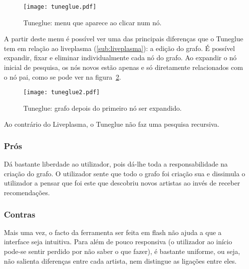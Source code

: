 \begin{figure}[tb]
  \begin{center}
    \texttt{[image: tuneglue.pdf]}
  \end{center}
  \caption{Tuneglue: menu que aparece ao clicar num nó.}
  \label{fig:sota_tuneglue}
\end{figure}

A partir deste menu é possível ver uma das principais diferenças que o Tuneglue tem em relação ao liveplasma (\ref{sub:liveplasma}): a edição do grafo.
É possível expandir, fixar e eliminar individualmente cada nó do grafo.
Ao expandir o nó inicial de pesquisa, os nós novos estão apenas e só diretamente relacionados com o nó pai, como se pode ver na figura~\ref{fig:sota_tuneglue2}.

\begin{figure}[tb]
  \begin{center}
    \texttt{[image: tuneglue2.pdf]}
  \end{center}
  \caption{Tuneglue: grafo depois do primeiro nó ser expandido.}
  \label{fig:sota_tuneglue2}
\end{figure}

Ao contrário do Liveplasma, o Tuneglue não faz uma pesquisa recursiva.

\subsubsection{Prós} %
\label{ssub:audiomap_pros}

Dá bastante liberdade ao utilizador, pois dá-lhe toda a responsabilidade na criação do grafo.
O utilizador sente que todo o grafo foi criação sua e dissimula o utilizador a pensar que foi este que descobriu novos artistas ao invés de receber recomendações.


\subsubsection{Contras} %
\label{ssub:audiomap_contras}

Mais uma vez, o facto da ferramenta ser feita em flash não ajuda a que a interface seja intuitiva.
Para além de pouco responsiva (o utilizador ao início pode-se sentir perdido por não saber o que fazer), é bastante uniforme, ou seja, não salienta diferenças entre cada artista, nem distingue as ligações entre eles.


